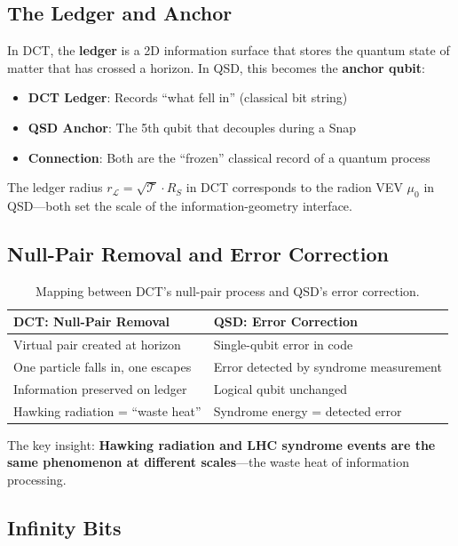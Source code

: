 \documentclass[11pt,a4paper]{article}
\theoremstyle{definition}
\newcommand{\Tc}{\mathcal{T}}           %
\newcommand{\murad}{\mu_0}              %
\newcommand{\LL}{\mathcal{L}}           %
\begin{document}
\subsection{The Ledger and Anchor}

In DCT, the \textbf{ledger} is a 2D information surface that stores the quantum state of matter that has crossed a horizon. In QSD, this becomes the \textbf{anchor qubit}:

\begin{itemize}[nosep]
    \item \textbf{DCT Ledger}: Records ``what fell in'' (classical bit string)
    \item \textbf{QSD Anchor}: The 5th qubit that decouples during a Snap
    \item \textbf{Connection}: Both are the ``frozen'' classical record of a quantum process
\end{itemize}

The ledger radius $r_{\LL} = \sqrt{\Tc} \cdot R_S$ in DCT corresponds to the radion VEV $\murad$ in QSD---both set the scale of the information-geometry interface.

\subsection{Null-Pair Removal and Error Correction}

\begin{table}[h]
\centering
\begin{tabular}{p{6cm}p{6cm}}
\toprule
\textbf{DCT: Null-Pair Removal} & \textbf{QSD: Error Correction} \\
\midrule
Virtual pair created at horizon & Single-qubit error in code \\
One particle falls in, one escapes & Error detected by syndrome measurement \\
Information preserved on ledger & Logical qubit unchanged \\
Hawking radiation = ``waste heat'' & Syndrome energy = detected error \\
\bottomrule
\end{tabular}
\caption{Mapping between DCT's null-pair process and QSD's error correction.}
\end{table}

The key insight: \textbf{Hawking radiation and LHC syndrome events are the same phenomenon at different scales}---the waste heat of information processing.

\subsection{Infinity Bits}
\end{document}
